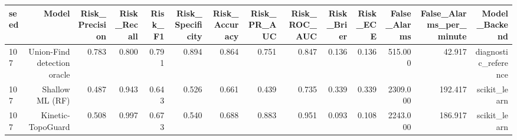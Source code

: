 \begin{tabular}{lrrrrrrrrrrrrr}
\toprule
seed & Model & Risk\_Precision & Risk\_Recall & Risk\_F1 & Risk\_Specificity & Risk\_Accuracy & Risk\_PR\_AUC & Risk\_ROC\_AUC & Risk\_Brier & Risk\_ECE & False\_Alarms & False\_Alarms\_per\_minute & Model\_Backend \\
\midrule
107 & Union-Find detection oracle & 0.783 & 0.800 & 0.791 & 0.894 & 0.864 & 0.751 & 0.847 & 0.136 & 0.136 & 515.000 & 42.917 & diagnostic\_reference \\
107 & Shallow ML (RF) & 0.487 & 0.943 & 0.643 & 0.526 & 0.661 & 0.439 & 0.735 & 0.339 & 0.339 & 2309.000 & 192.417 & scikit\_learn \\
107 & Kinetic-TopoGuard & 0.508 & 0.997 & 0.673 & 0.540 & 0.688 & 0.883 & 0.951 & 0.093 & 0.108 & 2243.000 & 186.917 & scikit\_learn \\
\bottomrule
\end{tabular}